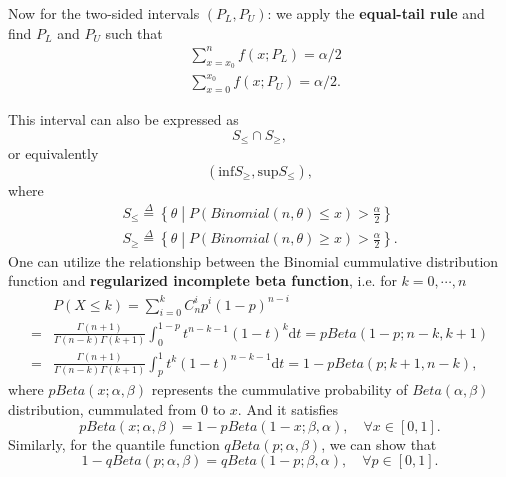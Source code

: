 \documentclass[a4paper,12pt]{article}
\begin{document}
Now for the two-sided intervals $\left(P_L, P_U\right)$: we apply the \textbf{equal-tail rule} and find $P_L$ and $P_U$ such that
\begin{equation}
  \label{eq:two_sided_p}
  \begin{aligned}
    & \sum\limits_{x = x_0}^nf\left(x;P_L\right) = \alpha / 2    \\
    & \sum\limits_{x = 0}^{x_0}f\left(x;P_U\right) = \alpha / 2
    .
  \end{aligned}
\end{equation}

This interval can also be expressed as
\[
  S_{\leq} \cap S_{\geq},
\]
or equivalently
\[
  \left(
    \mathrm{inf}S_{\geq}, \mathrm{sup}S_{\leq}
  \right)
  ,
\]
where
\[
  \begin{aligned}
    S_{\leq}\overset{\Delta}{=}\left\{
      \theta\middle|
      P\left(
        Binomial\left(n, \theta\right) \leq x
      \right)
      > \frac{\alpha}{2}
    \right\}    \\
    S_{\geq} \overset{\Delta}{=}\left\{
      \theta \middle|
      P\left(
        Binomial\left(n, \theta\right) \geq x
      \right)
      > \frac{\alpha}{2}
    \right\}
    .
  \end{aligned}
\]
One can utilize the relationship between the Binomial cummulative distribution function and \textbf{regularized incomplete beta function}, i.e. for $k = 0, \cdots, n$
\[
  \begin{aligned}
    &P\left(X\leq k\right) = \sum\limits_{i = 0}^{k}
    C_n^ip^i\left(1 - p\right)^{n - i}    \\
    =& \frac{\Gamma\left(n + 1\right)}{\Gamma\left(n - k\right)\Gamma\left(k + 1\right)}
    \int_0^{1 - p}t^{n - k - 1}\left(1 - t\right)^k\mathrm{d}t
    = pBeta\left(1 - p; n - k, k + 1\right)    \\
    =& \frac{\Gamma\left(n + 1\right)}{\Gamma\left(n - k\right)\Gamma\left(k + 1\right)}
    \int_{p}^1t^k\left(1 - t\right)^{n - k - 1}\mathrm{d}t
    = 1 - pBeta\left(p; k + 1, n - k\right)
    ,
  \end{aligned}
\]
where $pBeta\left(x;\alpha, \beta\right)$ represents the cummulative probability of $Beta\left(\alpha, \beta\right)$ distribution, cummulated from 0 to $x$. And it satisfies
\[
  pBeta\left(x; \alpha, \beta\right) = 1 - pBeta\left(1 - x; \beta, \alpha\right)
  ,\quad
  \forall x\in\left[0, 1\right].
\]
Similarly, for the quantile function $qBeta\left(p;\alpha, \beta\right)$, we can show that
\[
  1 - qBeta\left(p;\alpha, \beta\right) = qBeta\left(1 - p; \beta, \alpha\right)
  ,\quad \forall p\in\left[0, 1\right]
  .
\]
\end{document}
